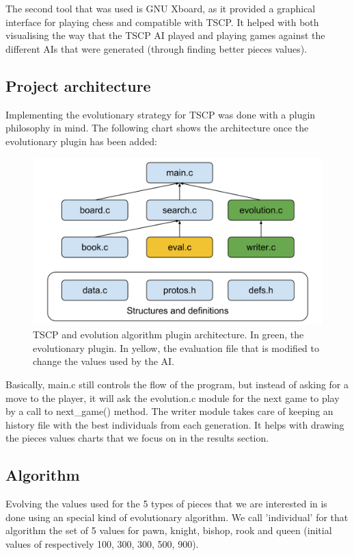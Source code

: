\documentclass[11pt,a4paper,twocolumn]{article}
\begin{document}
The second tool that was used is GNU Xboard, as it provided a graphical interface for playing chess and compatible with TSCP. It helped with both visualising the way that the TSCP AI played and playing games against the different AIs that were generated (through finding better pieces values).

\subsection{Project architecture}
Implementing the evolutionary strategy for TSCP was done with a plugin philosophy in mind. The following chart shows the architecture once the evolutionary plugin has been added:

\begin{center}
\begin{figure}
\includegraphics[scale=0.25]{images/Chess_AI_Architecture.png}
\caption{TSCP and evolution algorithm plugin architecture. In green, the evolutionary plugin. In yellow, the evaluation file that is modified to change the values used by the AI.}
\end{figure}
\end{center}

Basically, main.c still controls the flow of the program, but instead of asking for a move to the player, it will ask the evolution.c module for the next game to play by a call to next\_game() method. The writer module takes care of keeping an history file with the best individuals from each generation. It helps with drawing the pieces values charts that we focus on in the results section.

\subsection{Algorithm}
Evolving the values used for the 5 types of pieces that we are interested in is done using an special kind of evolutionary algorithm. We call 'individual' for that algorithm the set of 5 values for pawn, knight, bishop, rook and queen (initial values of respectively 100, 300, 300, 500, 900).
\end{document}
